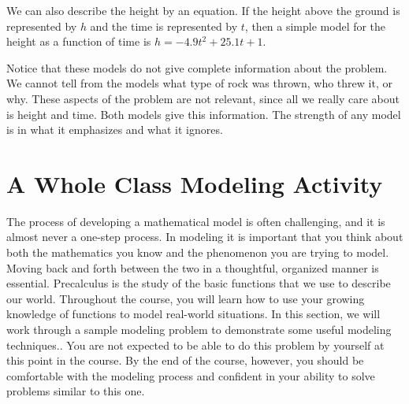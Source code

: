 \documentclass[10pt,]{book}
\theoremstyle{ptxdefinitionnotitle}
\theoremstyle{ptxdefinitiontitle}
\numberwithin{equation}{section}
\begin{document}
\hypertarget{p-11}{}%
We can also describe the height by an equation. If the height above the ground is represented by \(h\) and the time is represented by \(t\), then a simple model for the height as a function of time is \(h = -4.9t^2 + 25.1t + 1\).%
\par
\hypertarget{p-12}{}%
Notice that these models do not give complete information about the problem. We cannot tell from the models what type of rock was thrown, who threw it, or why. These aspects of the problem are not relevant, since all we really care about is height and time. Both models give this information. The strength of any model is in what it emphasizes and what it ignores.%
\typeout{************************************************}
\typeout{************************************************}
\section[{A Whole Class Modeling Activity}]{A Whole Class Modeling Activity}\label{chapter01-section02}
\hypertarget{p-13}{}%
The process of developing a mathematical model is often challenging, and it is almost never a one-step process. In modeling it is important that you think about both the mathematics you know and the phenomenon you are trying to model. Moving back and forth between the two in a thoughtful, organized manner is essential. Precalculus is the study of the basic functions that we use to describe our world. Throughout the course, you will learn how to use your growing knowledge of functions to model real-world situations. In this section, we will work through a sample modeling problem to demonstrate some useful modeling techniques.. You are not expected to be able to do this problem by yourself at this point in the course. By the end of the course, however, you should be comfortable with the modeling process and confident in your ability to solve problems similar to this one.%
\typeout{************************************************}
\typeout{************************************************}
\end{document}
